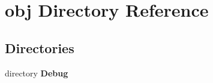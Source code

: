 \section{obj Directory Reference}
\label{dir_43724e81dd40e09f32417973865cdd64}
\subsection*{Directories}
\begin{DoxyCompactItemize}
\item 
directory {\bf Debug}
\end{DoxyCompactItemize}
